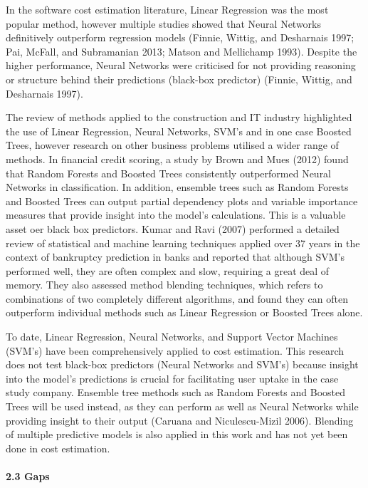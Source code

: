 \documentclass[]{elsarticle} %
\begin{document}
In the software cost estimation literature, Linear Regression was the
most popular method, however multiple studies showed that Neural
Networks definitively outperform regression models (Finnie, Wittig, and
Desharnais 1997; Pai, McFall, and Subramanian 2013; Matson and
Mellichamp 1993). Despite the higher performance, Neural Networks were
criticised for not providing reasoning or structure behind their
predictions (black-box predictor) (Finnie, Wittig, and Desharnais 1997).

The review of methods applied to the construction and IT industry
highlighted the use of Linear Regression, Neural Networks, SVM's and in
one case Boosted Trees, however research on other business problems
utilised a wider range of methods. In financial credit scoring, a study
by Brown and Mues (2012) found that Random Forests and Boosted Trees
consistently outperformed Neural Networks in classification. In
addition, ensemble trees such as Random Forests and Boosted Trees can
output partial dependency plots and variable importance measures that
provide insight into the model's calculations. This is a valuable asset
oer black box predictors. Kumar and Ravi (2007) performed a detailed
review of statistical and machine learning techniques applied over 37
years in the context of bankruptcy prediction in banks and reported that
although SVM's performed well, they are often complex and slow,
requiring a great deal of memory. They also assessed method blending
techniques, which refers to combinations of two completely different
algorithms, and found they can often outperform individual methods such
as Linear Regression or Boosted Trees alone.

To date, Linear Regression, Neural Networks, and Support Vector Machines
(SVM's) have been comprehensively applied to cost estimation. This
research does not test black-box predictors (Neural Networks and SVM's)
because insight into the model's predictions is crucial for facilitating
user uptake in the case study company. Ensemble tree methods such as
Random Forests and Boosted Trees will be used instead, as they can
perform as well as Neural Networks while providing insight to their
output (Caruana and Niculescu-Mizil 2006). Blending of multiple
predictive models is also applied in this work and has not yet been done
in cost estimation.

\paragraph{2.3 Gaps}\label{gaps}
\end{document}
